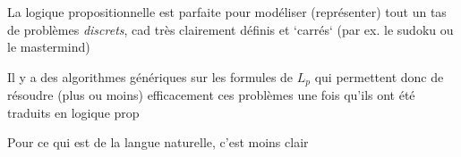 

%
%
%
%
%
%
%
%
%
%
%
%
%


\begin{frame}

La logique propositionnelle est parfaite pour modéliser (représenter) tout un tas de problèmes \textit{discrets}, cad très clairement définis et `carrés` (par ex. le sudoku ou le mastermind)\pause\newline

Il y a des algorithmes génériques sur les formules de $L_p$ qui permettent donc de résoudre (plus ou moins) efficacement ces problèmes une fois qu'ils ont été traduits en logique prop\pause\newline

Pour ce qui est de la langue naturelle, c'est moins clair

\end{frame}


